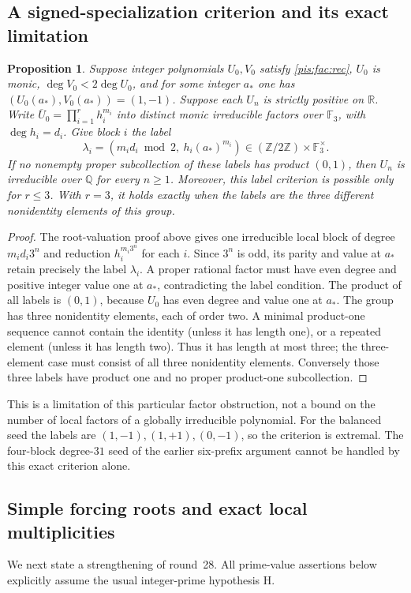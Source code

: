 \documentclass[11pt,a4paper]{article}
\newtheorem{proposition}[theorem]{Proposition}
\theoremstyle{definition}\newtheorem{definition}[theorem]{Definition}
\theoremstyle{remark}\newtheorem{remark}[theorem]{Remark}
\begin{document}
\subsection{A signed-specialization criterion and its exact limitation}
\begin{proposition}\label{pis:fac:signcriterion}
Suppose integer polynomials $U_0,V_0$ satisfy \eqref{pis:fac:rec}, $U_0$ is
monic, $\deg V_0<2\deg U_0$, and for some integer $a_*$ one has
$(U_0(a_*),V_0(a_*))=(1,-1)$. Suppose each $U_n$ is strictly positive
on $\mathbb R$. Write
$\overline U_0=\prod_{i=1}^r h_i^{m_i}$ into distinct monic irreducible
factors over $\mathbb F_3$, with $\deg h_i=d_i$. Give block $i$ the label
\[
 \lambda_i=(m_id_i\bmod2,\ h_i(a_*)^{m_i})
 \in(\mathbb Z/2\mathbb Z)\times\mathbb F_3^\times.
\]
If no nonempty proper subcollection of these labels has product
$(0,1)$, then $U_n$ is irreducible over $\mathbb Q$ for every $n\ge1$.
Moreover, this label criterion is possible only for $r\le3$. With
$r=3$, it holds exactly when the labels are the three different
nonidentity elements of this group.
\end{proposition}
\begin{proof}
The root-valuation proof above gives one irreducible local block of
degree $m_id_i3^n$ and reduction $h_i^{m_i3^n}$ for each $i$.
Since $3^n$ is odd, its parity and value at $a_*$ retain precisely the
label $\lambda_i$. A proper rational factor must have even degree and
positive integer value one at $a_*$, contradicting the label condition.
The product of all labels is $(0,1)$, because $U_0$ has even degree
and value one at $a_*$. The group has three nonidentity elements,
each of order two. A minimal product-one sequence cannot contain the
identity (unless it has length one), or a repeated element (unless
it has length two). Thus it has length at most three; the three-element
case must consist of all three nonidentity elements. Conversely those
three labels have product one and no proper product-one subcollection.
\end{proof}
This is a limitation of this particular factor obstruction, not a
bound on the number of local factors of a globally irreducible polynomial.
For the balanced seed the labels are $(1,-1),(1,+1),(0,-1)$, so the
criterion is extremal. The four-block degree-$31$ seed of the earlier
six-prefix argument cannot be handled by this exact criterion alone.

\subsection{Simple forcing roots and exact local multiplicities}
We next state a strengthening of round~28. All prime-value assertions
below explicitly assume the usual integer-prime hypothesis H.
\end{document}

